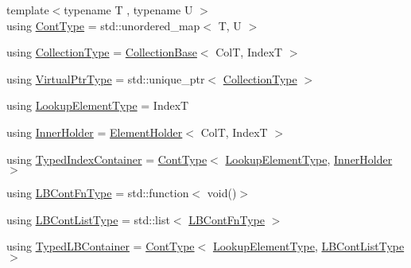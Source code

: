 \begin{DoxyCompactItemize}
\item 
{\footnotesize template$<$typename T , typename U $>$ }\\using \hyperlink{structvt_1_1vrt_1_1collection_1_1_holder_ae3bb115b69cf47e14a4e8441cebe9142}{Cont\+Type} = std\+::unordered\+\_\+map$<$ T, U $>$
\item 
using \hyperlink{structvt_1_1vrt_1_1collection_1_1_holder_a38b4a4bfc4408cf28918c32433c80aac}{Collection\+Type} = \hyperlink{structvt_1_1vrt_1_1collection_1_1_collection_base}{Collection\+Base}$<$ ColT, IndexT $>$
\item 
using \hyperlink{structvt_1_1vrt_1_1collection_1_1_holder_a04ba57a7b2c48ce6b4c90d3f3b33f43c}{Virtual\+Ptr\+Type} = std\+::unique\+\_\+ptr$<$ \hyperlink{structvt_1_1vrt_1_1collection_1_1_holder_a38b4a4bfc4408cf28918c32433c80aac}{Collection\+Type} $>$
\item 
using \hyperlink{structvt_1_1vrt_1_1collection_1_1_holder_a3206c3e5eb5d6deb4667409222163b77}{Lookup\+Element\+Type} = IndexT
\item 
using \hyperlink{structvt_1_1vrt_1_1collection_1_1_holder_aafc9b515450179bad7f03e17010b59f8}{Inner\+Holder} = \hyperlink{structvt_1_1vrt_1_1collection_1_1_element_holder}{Element\+Holder}$<$ ColT, IndexT $>$
\item 
using \hyperlink{structvt_1_1vrt_1_1collection_1_1_holder_ae8d4ff940c971d52b237cf4d6049380a}{Typed\+Index\+Container} = \hyperlink{structvt_1_1vrt_1_1collection_1_1_holder_ae3bb115b69cf47e14a4e8441cebe9142}{Cont\+Type}$<$ \hyperlink{structvt_1_1vrt_1_1collection_1_1_holder_a3206c3e5eb5d6deb4667409222163b77}{Lookup\+Element\+Type}, \hyperlink{structvt_1_1vrt_1_1collection_1_1_holder_aafc9b515450179bad7f03e17010b59f8}{Inner\+Holder} $>$
\item 
using \hyperlink{structvt_1_1vrt_1_1collection_1_1_holder_a01812f8ee06d3a67e1a9aa2765989913}{L\+B\+Cont\+Fn\+Type} = std\+::function$<$ void()$>$
\item 
using \hyperlink{structvt_1_1vrt_1_1collection_1_1_holder_af26a59243dd4e1a86d8fcf320a8dc463}{L\+B\+Cont\+List\+Type} = std\+::list$<$ \hyperlink{structvt_1_1vrt_1_1collection_1_1_holder_a01812f8ee06d3a67e1a9aa2765989913}{L\+B\+Cont\+Fn\+Type} $>$
\item 
using \hyperlink{structvt_1_1vrt_1_1collection_1_1_holder_a9738cadcf89ace9c3d0c23990e4f919e}{Typed\+L\+B\+Container} = \hyperlink{structvt_1_1vrt_1_1collection_1_1_holder_ae3bb115b69cf47e14a4e8441cebe9142}{Cont\+Type}$<$ \hyperlink{structvt_1_1vrt_1_1collection_1_1_holder_a3206c3e5eb5d6deb4667409222163b77}{Lookup\+Element\+Type}, \hyperlink{structvt_1_1vrt_1_1collection_1_1_holder_af26a59243dd4e1a86d8fcf320a8dc463}{L\+B\+Cont\+List\+Type} $>$

\end{DoxyCompactItemize}

